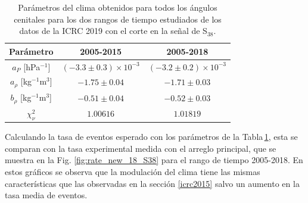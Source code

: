    \begin{table}[H]
       \centering
       \begin{tabular}{c|c|c}
       {Parámetro}                 & {2005-2015}    		        & {2005-2018}    \\ \hline \hline
       $a_P$ [hPa$^{-1}$]          & $ (-3.3\pm 0.3)\times 10^{-3}$& $(-3.2\pm 0.2)\times 10^{-3}$  \\ \hline
       $a_\rho$ [kg$^{-1}$m$^3$]   & $ -1.75\pm 0.04$            	& $ -1.71\pm 0.03$       \\ \hline
       $b_\rho$ [kg$^{-1}$m$^3$]   & $ -0.51\pm 0.04$             	& $ -0.52\pm 0.03$       \\ \hline
       $\chi^2_\nu$                & $1.00616$                     & $1.01819$              \\   
       \end{tabular} 
       \caption{Parámetros del clima obtenidos para todos los ángulos cenitales para los dos rangos de tiempo estudiados de los datos de la ICRC 2019 con el corte en la señal de S$_{38}$.} \label{tabla:parametros_ICRC_2019_S38}
   \end{table}
   
   Calculando la tasa de eventos esperado con los parámetros de la Tabla\,\ref{tabla:parametros_ICRC_2019_S38}, esta se comparan con la tasa experimental medida con el arreglo principal, que se muestra en la Fig. \ref{fig:rate_new_18_S38} para el rango de tiempo 2005-2018. En estos gráficos se observa que la modulación del clima tiene las mismas características que las observadas en la sección \ref{icrc2015} salvo un aumento en la tasa media de eventos.

